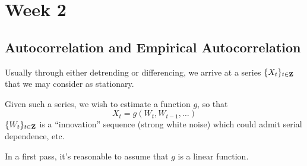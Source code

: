 \chapter{Week 2}
\section{Autocorrelation and Empirical Autocorrelation}
Usually through either detrending or differencing, we arrive
at a series $ \{X_t\}_{t\in\mathbf{Z}} $ that we may consider as stationary.

Given such a series, we wish to estimate a function $ g $, so that
\[ X_t=g(W_t,W_{t-1},\ldots) \]
$ \{W_t\}_{t\in\mathbf{Z}} $ is a ``innovation'' sequence (strong white noise)
which could admit serial dependence, etc.

In a first pass, it's reasonable to assume that $ g $ is a linear function.

